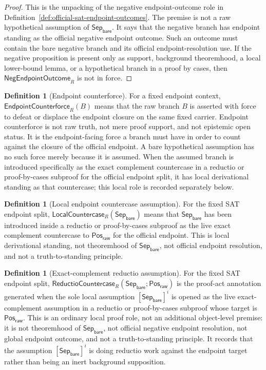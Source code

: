 \documentclass[11pt]{article}
\theoremstyle{definition}
\newtheorem{definition}[theorem]{Definition}
\theoremstyle{remark}
\newcommand{\PosRaw}{\mathsf{Pos}_{\mathsf{raw}}}
\newcommand{\SepBare}{\mathsf{Sep}_{\mathsf{bare}}}
\newcommand{\NegEndpointOutcome}{\mathsf{NegEndpointOutcome}}
\newcommand{\EndpointCounterforce}{\mathsf{EndpointCounterforce}}
\newcommand{\LocalCountercase}{\mathsf{LocalCountercase}}
\newcommand{\ReductioCountercase}{\mathsf{ReductioCountercase}}
\begin{document}
\begin{proof}
This is the unpacking of the negative endpoint-outcome role in Definition~\ref{def:official-sat-endpoint-outcomes}. The premise is not a raw hypothetical assumption of \(\SepBare\). It says that the negative branch has endpoint standing as the official negative endpoint outcome. Such an outcome must contain the bare negative branch and its official endpoint-resolution use. If the negative proposition is present only as support, background theoremhood, a local lower-bound lemma, or a hypothetical branch in a proof by cases, then \(\NegEndpointOutcome_R\) is not in force.
\end{proof}


\begin{definition}[Endpoint counterforce]
\label{def:endpoint-counterforce}
For a fixed endpoint context, \(\EndpointCounterforce_R(B)\) means that the raw branch \(B\) is asserted with force to defeat or displace the endpoint closure on the same fixed carrier. Endpoint counterforce is not raw truth, not mere proof support, and not epistemic open status. It is the endpoint-facing force a branch must have in order to count against the closure of the official endpoint. A bare hypothetical assumption has no such force merely because it is assumed. When the assumed branch is introduced specifically as the exact complement countercase in a reductio or proof-by-cases subproof for the official endpoint split, it has local derivational standing as that countercase; this local role is recorded separately below.
\end{definition}



\begin{definition}[Local endpoint countercase assumption]
\label{def:local-countercase-assumption}
For the fixed SAT endpoint split, \(\LocalCountercase_R(\SepBare)\) means that \(\SepBare\) has been introduced inside a reductio or proof-by-cases subproof as the live exact complement countercase to \(\PosRaw\) for the official endpoint. This is local derivational standing, not theoremhood of \(\SepBare\), not official endpoint resolution, and not a truth-to-standing principle.

\end{definition}

\begin{definition}[Exact-complement reductio assumption]
\label{def:exact-complement-reductio-assumption}
For the fixed SAT endpoint split, \(\ReductioCountercase_R(\SepBare;\PosRaw)\) is the proof-act annotation generated when the sole local assumption \([\SepBare]^i\) is opened as the live exact-complement assumption in a reductio or proof-by-cases subproof whose target is \(\PosRaw\). This is an ordinary local proof role, not an additional object-level premise: it is not theoremhood of \(\SepBare\), not official negative endpoint resolution, not global endpoint outcome, and not a truth-to-standing principle. It records that the assumption \([\SepBare]^i\) is doing reductio work against the endpoint target rather than being an inert background supposition.
\end{definition}
\end{document}
